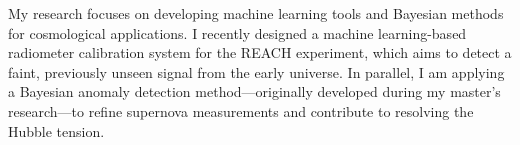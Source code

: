 My research focuses on developing machine learning tools and Bayesian methods for cosmological applications. I recently designed a machine learning-based radiometer calibration system for the REACH experiment, which aims to detect a faint, previously unseen signal from the early universe. In parallel, I am applying a Bayesian anomaly detection method—originally developed during my master's research—to refine supernova measurements and contribute to resolving the Hubble tension.